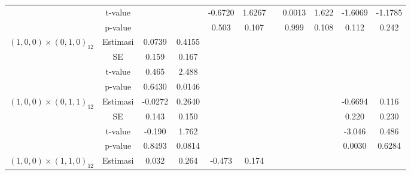 \begin{enumerate}[label=\alph*.]
\begin{longtable}{|c|c|c|c|c|c|c|c|c|c|c|}
            & t-value
            & {} & {}
            & {-0.6720} & {1.6267} & {}
            & {0.0013} & {1.622}
            & {-1.6069} & {-1.1785} \\ \cline{2-11}

            & p-value
            & {} & {}
            & {0.503} & {0.107} & {}
            & {0.999} & {0.108}
            & {0.112} & {0.242} \\ \hline

            \multirow{4}{*}{$(1,0,0)\times(0,1,0)_{12}$}
            & Estimasi
            & {0.0739} & {0.4155}
            & {} & {} & {}
            & {} & {}
            & {} & {} \\ \cline{2-11}

            & SE
            & {0.159} & {0.167}
            & {} & {} & {}
            & {} & {}
            & {} & {} \\ \cline{2-11}

            & t-value
            & {0.465} & {2.488}
            & {} & {} & {}
            & {} & {}
            & {} & {} \\ \cline{2-11}

            & p-value
            & {0.6430} & {0.0146}
            & {} & {} & {}
            & {} & {}
            & {} & {} \\ \hline

            \multirow{4}{*}{$(1,0,0)\times(0,1,1)_{12}$}
            & Estimasi
            & {-0.0272} & {0.2640}
            & {} & {} & {}
            & {} & {}
            & {-0.6694} & {0.116} \\ \cline{2-11}

            & SE
            & {0.143} & {0.150}
            & {} & {} & {}
            & {} & {}
            & {0.220} & {0.230} \\ \cline{2-11}

            & t-value
            & {-0.190} & {1.762}
            & {} & {} & {}
            & {} & {}
            & {-3.046} & {0.486} \\ \cline{2-11}

            & p-value
            & {0.8493} & {0.0814}
            & {} & {} & {}
            & {} & {}
            & {0.0030} & {0.6284} \\ \hline

            \multirow[t]{4}{*}{$(1,0,0)\times(1,1,0)_{12}$}
            & Estimasi
            & {0.032} & {0.264}
            & {-0.473} & {0.174} & {}
            & {} & {}
            & {} & {} \\ \cline{2-11}


\end{longtable}
\end{enumerate}
